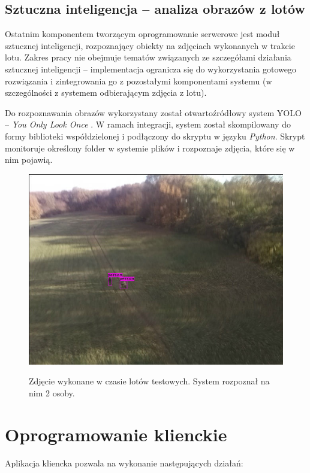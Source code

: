 \subsection{Sztuczna inteligencja -- analiza obrazów z lotów}

Ostatnim komponentem tworzącym oprogramowanie serwerowe jest moduł sztucznej inteligencji,
rozpoznający obiekty na zdjęciach wykonanych w trakcie lotu. Zakres pracy nie obejmuje
tematów związanych ze szczegółami działania sztucznej inteligencji -- implementacja
ogranicza się do wykorzystania gotowego rozwiązania i zintegrowania
go z pozostałymi komponentami systemu (w szczególności z systemem
odbierającym zdjęcia z lotu).

Do rozpoznawania obrazów wykorzystany został otwartoźródłowy system
YOLO -- \textit{You Only Look Once} \cite{yolo}. W ramach integracji, system został
skompilowany do formy biblioteki współdzielonej i podłączony do skryptu
w języku \textit{Python}. Skrypt monitoruje określony folder w systemie plików
i rozpoznaje zdjęcia, które się w nim pojawią.


\begin{figure}[H]
	\centering
	\caption{ Zdjęcie wykonane w czasie lotów testowych. System rozpoznał na nim 2 osoby.}
\includegraphics[width=.7\linewidth]{rys03/rozpoznane_yolo.jpg}
	\label{yolo_example}
\end{figure}

\section{Oprogramowanie klienckie}

Aplikacja kliencka pozwala na wykonanie następujących działań:

